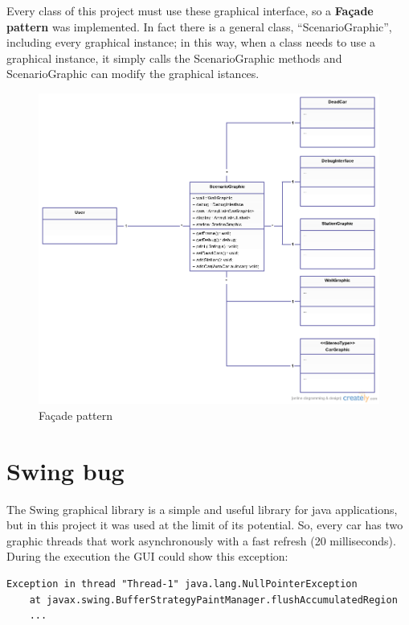 \documentclass[a4paper,titlepage]{article}
\begin{document}
Every class of this project must use these graphical interface, so a \textbf{Façade pattern} was implemented. In fact there is a general class, ``ScenarioGraphic'', including every graphical instance; in this way, when a class needs to use a graphical instance, it simply calls the ScenarioGraphic methods and ScenarioGraphic can modify the graphical istances. 
\newpage
\begin{figure}[!ht]
\centering
\includegraphics[scale=0.4]{facade.png}
\caption{Façade pattern}
\end{figure}

\newpage

\section{Swing bug}

The Swing graphical library is a simple and useful library for java applications, but in this project it was used at the limit of its potential. So, every car has two graphic threads that work asynchronously with a fast refresh (20 milliseconds). During the execution the GUI could show this exception: 

\begin{verbatim}
Exception in thread "Thread-1" java.lang.NullPointerException
	at javax.swing.BufferStrategyPaintManager.flushAccumulatedRegion
	...
\end{verbatim}
\end{document}
